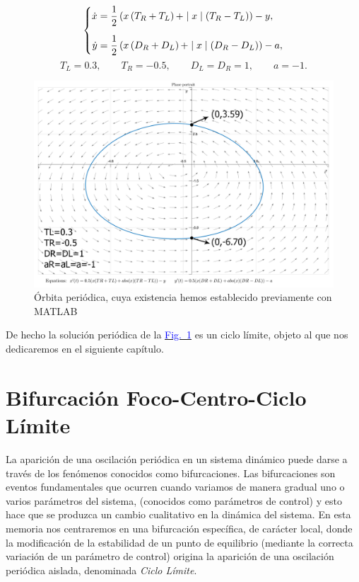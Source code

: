 \documentclass[12pt,a4paper]{report} %
\newcommand{\fref}[1]{\hyperref[#1]{\textcolor{blue}{Fig.~\ref*{#1}}}}
\begin{document}
	\begin{equation}
		\label{eq:clejem}
		\scalebox{1}{$\displaystyle
			\left\{
			\begin{aligned}
			\dot{x}&=\frac{1}{2}\left( x\left(T_R+T_L\right)+\mid x\mid \left(T_R-T_L\right)\right)-y,
				 \\[2mm]
			\dot{y}&=\frac{1}{2}\left( x\left(D_R+D_L\right)+\mid x\mid \left(D_R-D_L\right)\right)-a,
			\end{aligned}
			\right. 
			$}
	\end{equation}\smallskip
	\begin{equation*}
		T_L=0.3, \qquad T_R=-0.5, \qquad D_L=D_R=1, \qquad a=-1.
	\end{equation*}\smallskip
	
	\begin{figure}[h]
		\centering
		\includegraphics[width=1\textwidth]{clejemplo.jpg}
		\caption{Órbita periódica, cuya existencia hemos establecido previamente con MATLAB}
		\label{fig:clejemplo}
	\end{figure}\smallskip
	
	\vspace{0.5cm} De hecho la solución periódica de la \fref{fig:clejemplo} es un ciclo límite, objeto al que nos dedicaremos en el siguiente capítulo.
	
	\newpage
	
	\chapter{Bifurcación Foco-Centro-Ciclo Límite}
	\label{cap.5}

	La aparición de una oscilación periódica en un sistema dinámico puede darse a través de los fenómenos conocidos como bifurcaciones. Las bifurcaciones son eventos fundamentales que ocurren cuando variamos de manera gradual uno o varios parámetros del sistema, (conocidos como parámetros de control) y esto hace que se produzca un cambio cualitativo en la dinámica del sistema. En esta memoria nos centraremos en una bifurcación específica, de carácter local, donde la modificación de la estabilidad de un punto de equilibrio (mediante la correcta variación de un parámetro de control) origina la aparición de una oscilación periódica aislada, denominada \textit{Ciclo Límite}.
\end{document}
